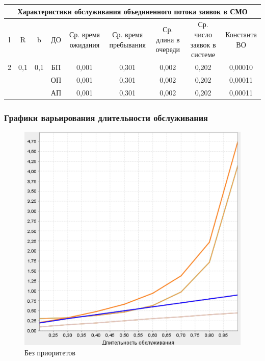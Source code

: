\begin{adjustbox}{max width=\textwidth}
\begin{tabular}{|c|c|c|c|c|c|c|c|c|}
\hline
\multicolumn{9}{|c|}{Характеристики обслуживания объединенного потока заявок в СМО} \\ \hline
l & R & b & ДО & Ср. время ожидания & Ср. время пребывания & Ср. длина в очереди & Ср. число заявок в системе & Константа ВО \\ \hline
2 & 0,1 & 0,1 & БП & 0,001  & 0,301 & 0,002 & 0,202 & 0,00010 \\ \hline
 &  &  & ОП & 0,001 & 0,301 & 0,002 & 0,202 & 0,00011 \\ \hline
 &  &  & АП & 0,001 & 0,301 & 0,002 & 0,202 & 0,00011 \\ \hline

\end{tabular}
\end{adjustbox}

\subsubsection{Графики варьирования длительности обслуживания}

\begin{figure}[h]
\centering
\includegraphics[resolution=200]{img/bp.png}
\caption{Без приоритетов}
\end{figure}

